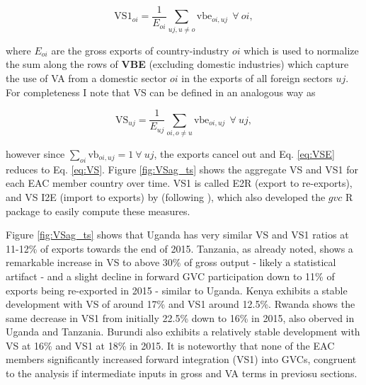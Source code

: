 \documentclass[a4paper]{article}
\begin{document}
\begin{equation} \label{eq:VS1}
\text{VS1}_{oi} = \frac{1}{E_{oi}} \sum_{uj, u \neq  o} \text{vbe}_{oi, uj}\ \ \forall\ oi,
\end{equation}

where $E_{oi}$ are the gross exports of country-industry $oi$ which is used to normalize the sum along the rows of \textbf{VBE} (excluding domestic industries) which capture the use of VA from a domestic sector $oi$ in the exports of all foreign sectors $uj$. For completeness I note that VS can be defined in an analogous way as

\begin{equation} \label{eq:VSE}
\text{VS}_{uj} = \frac{1}{E_{uj}} \sum_{oi, o \neq  u} \text{vbe}_{oi, uj}\ \ \forall\ uj,
\end{equation}

\noindent however since $\sum_{oi} \text{vb}_{oi, uj} = 1\ \forall\ uj$, the exports cancel out and Eq. \ref{eq:VSE} reduces to Eq. \ref{eq:VS}. Figure \ref{fig:VSag_ts} shows the aggregate VS and VS1 for each EAC member country over time. VS1 is called E2R (export to re-exports), and VS I2E (import to exports) by \citet{Kummritz20162} (following \citet{baldwin2015supply}), which also developed the $gvc$ R package to easily compute these measures. \newline 

Figure \ref{fig:VSag_ts} shows that Uganda has very similar VS and VS1 ratios at 11-12\% of exports towards the end of 2015. Tanzania, as already noted, shows a remarkable increase in VS to above 30\% of gross output - likely a statistical artifact - and a slight decline in forward GVC participation down to 11\% of exports being re-exported in 2015 - similar to Uganda. Kenya exhibits a stable development with VS of around 17\% and VS1 around 12.5\%. Rwanda shows the same decrease in VS1 from initially 22.5\% down to 16\% in 2015, also oberved in Uganda and Tanzania. Burundi also exhibits a relatively stable development with VS at 16\% and VS1 at 18\% in 2015. It is noteworthy that 
none of the EAC members significantly increased forward integration (VS1) into GVCs, congruent to the analysis if intermediate inputs in gross and VA terms in previosu sections. %

\end{document}
